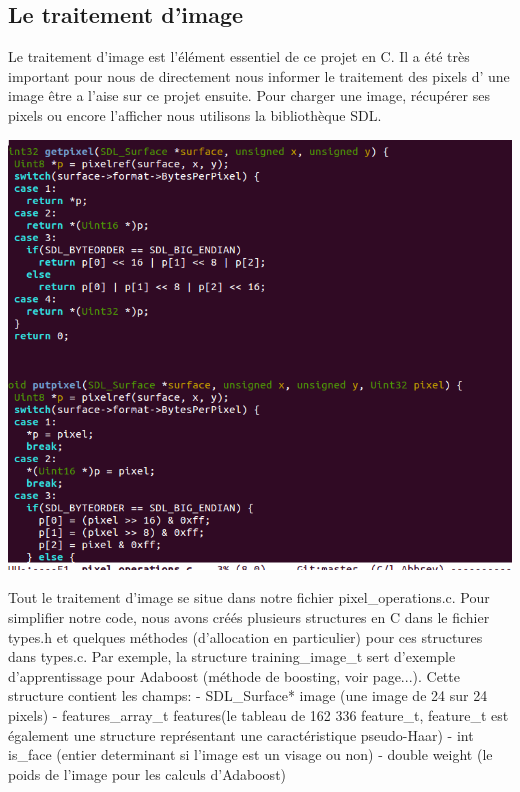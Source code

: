 \documentclass[12pt,a4paper]{article}
\begin{document}
\newpage
\subsection{Le traitement d'image}
Le traitement d'image est l'élément essentiel de ce projet en C. Il a été très important pour nous de directement nous informer le traitement des pixels d' une image être a l'aise sur ce projet ensuite. Pour charger une image, récupérer ses pixels ou encore l'afficher nous utilisons la bibliothèque SDL.

\vspace{0.8cm}
\includegraphics[scale=.5]{Pictures/sdl.png}
\vspace{0.8cm}

\newpage
Tout le traitement d'image se situe dans notre fichier pixel\_operations.c. Pour simplifier notre code, nous avons créés plusieurs structures en C dans le fichier types.h et quelques méthodes (d'allocation en particulier) pour ces structures dans types.c.
Par exemple, la structure training\_image\_t sert d'exemple d'apprentissage pour Adaboost (méthode de boosting, voir page...). Cette structure contient les champs:
- SDL\_Surface* image (une image de 24 sur 24 pixels)
- features\_array\_t features(le tableau de 162 336 feature\_t, feature\_t est également une structure représentant une caractéristique pseudo-Haar)
- int is\_face (entier determinant si l'image est un visage ou non)
- double weight (le poids de l'image pour les calculs d'Adaboost)
\end{document}
